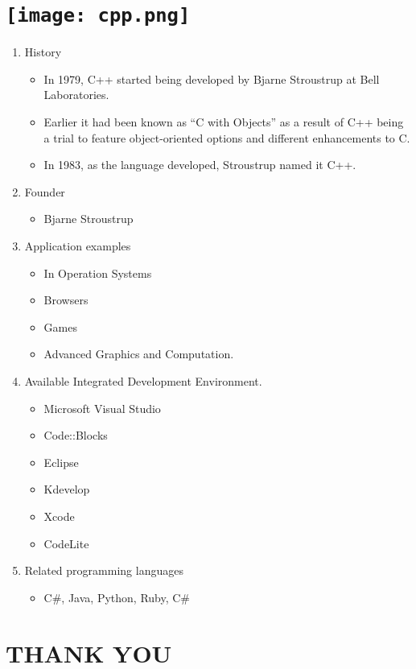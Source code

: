 \section{\texttt{[image: cpp.png]}}
\begin{frame}
	
	
	\begin{enumerate}
		\item History
		\begin{itemize}
			\item In 1979, C++ started being developed by Bjarne Stroustrup at Bell Laboratories.
			\item Earlier it had been known as  “C with Objects” as a result of C++ being a trial to feature object-oriented options and different enhancements to C.
			\item In 1983, as the language developed, Stroustrup named it C++. 
		\end{itemize}
		\item Founder
		\begin{itemize}
			\item Bjarne Stroustrup
		\end{itemize}
		\item Application examples
		\begin{itemize}
			\item In Operation Systems
			\item Browsers
			\item Games
			\item Advanced Graphics and Computation.
		\end{itemize}
		\item Available Integrated Development Environment.
		\begin{itemize}
			\item Microsoft Visual Studio
			\item Code::Blocks
			\item Eclipse
			\item Kdevelop
			\item Xcode
			\item CodeLite
		\end{itemize}
		\item Related programming languages
		\begin{itemize}
			\item C#, Java, Python, Ruby, C#
		\end{itemize}
	\end{enumerate}
	
\end{frame}



\section{\textbf{THANK YOU}}




